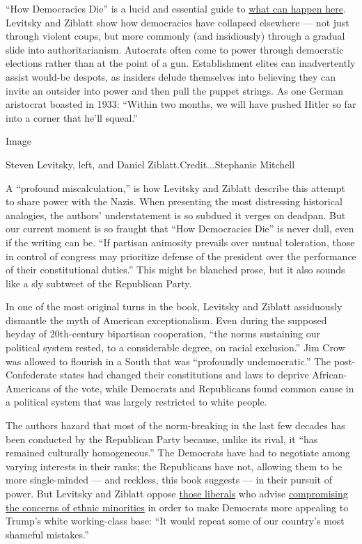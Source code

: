 ``How Democracies Die'' is a lucid and essential guide to
\href{https://www.nytimes3xbfgragh.onion/2017/01/17/books/review/classic-novel-that-predicted-trump-sinclar-lewis-it-cant-happen-here.html}{what
can happen here}. Levitsky and Ziblatt show how democracies have
collapsed elsewhere --- not just through violent coups, but more
commonly (and insidiously) through a gradual slide into
authoritarianism. Autocrats often come to power through democratic
elections rather than at the point of a gun. Establishment elites can
inadvertently assist would-be despots, as insiders delude themselves
into believing they can invite an outsider into power and then pull the
puppet strings. As one German aristocrat boasted in 1933: ``Within two
months, we will have pushed Hitler so far into a corner that he'll
squeal.''

Image

Steven Levitsky, left, and Daniel Ziblatt.Credit...Stephanie Mitchell

A ``profound miscalculation,'' is how Levitsky and Ziblatt describe this
attempt to share power with the Nazis. When presenting the most
distressing historical analogies, the authors' understatement is so
subdued it verges on deadpan. But our current moment is so fraught that
``How Democracies Die'' is never dull, even if the writing can be. ``If
partisan animosity prevails over mutual toleration, those in control of
congress may prioritize defense of the president over the performance of
their constitutional duties.'' This might be blanched prose, but it also
sounds like a sly subtweet of the Republican Party.

In one of the most original turns in the book, Levitsky and Ziblatt
assiduously dismantle the myth of American exceptionalism. Even during
the supposed heyday of 20th-century bipartisan cooperation, ``the norms
sustaining our political system rested, to a considerable degree, on
racial exclusion.'' Jim Crow was allowed to flourish in a South that was
``profoundly undemocratic.'' The post-Confederate states had changed
their constitutions and laws to deprive African-Americans of the vote,
while Democrats and Republicans found common cause in a political system
that was largely restricted to white people.

The authors hazard that most of the norm-breaking in the last few
decades has been conducted by the Republican Party because, unlike its
rival, it ``has remained culturally homogeneous.'' The Democrats have
had to negotiate among varying interests in their ranks; the Republicans
have not, allowing them to be more single-minded --- and reckless, this
book suggests --- in their pursuit of power. But Levitsky and Ziblatt
oppose
\href{https://www.nytimes3xbfgragh.onion/2016/11/20/opinion/sunday/the-end-of-identity-liberalism.html}{those
liberals} who advise
\href{https://www.nytimes3xbfgragh.onion/2017/07/06/opinion/center-democrats-identity-politics.html}{compromising
the concerns of ethnic minorities} in order to make Democrats more
appealing to Trump's white working-class base: ``It would repeat some of
our country's most shameful mistakes.''

